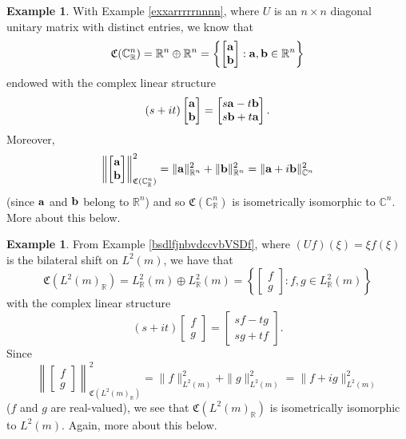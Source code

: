 \documentclass{dis}
\theoremstyle{plain}
\theoremstyle{definition}
\newtheorem{Example}[equation]{Example}
\def\C{\mathbb{C}}
\def\R{\mathbb{R}}
\renewcommand{\vec}[1]{{\bf #1}}
\newcommand{\0}{{\color{lightgray}0}}
\begin{document}
\begin{Example}\label{diagonallslslslsls}
With Example \ref{exxarrrrrnnnn}, where $U$ is an $n \times n$ diagonal unitary matrix with distinct entries, we know that 
$$\mathfrak{C}(\C^n_{\R}) = \R^n \oplus \R^n  = \left\{\begin{bmatrix} \vec{a} \\ \vec{b} \end{bmatrix}: \vec{a}, \vec{b} \in \R^n\right\}$$
endowed with the complex linear structure
$$(s + i t) \begin{bmatrix} \vec{a}\\ \vec{b}\end{bmatrix} = \begin{bmatrix} s \vec{a} - t \vec{b}\\ s \vec{b} + t \vec{a}\end{bmatrix}.$$
Moreover, 
$$\left\| \begin{bmatrix} \vec{a}\\ \vec{b}\end{bmatrix}\right\|^{2}_{\mathfrak{C}(\C^{n}_{\R})} = \|\vec{a}\|_{\R^n}^{2} + \|\vec{b}\|_{\R^n}^{2} = \|\vec{a} + i \vec{b} \|^{2}_{\C^n}$$ (since $\vec{a}$ and  $\vec{b}$ belong to $\R^n$) and so $\mathfrak{C}(\C^{n}_{\R})$ is isometrically isomorphic to $\C^n$.  More about this below.
\end{Example}


\begin{Example}\label{bilallateralll}
From Example \ref{bsdlfjnbvdccvbVSDf}, where $(U f)(\xi) = \xi f(\xi)$ is the bilateral shift on $L^2(m)$,  we have that
$$\mathfrak{C}(L^2(m)_{\R}) =  L^{2}_{\R}(m) \oplus L^{2}_{\R}(m) =  \left\{\begin{bmatrix} f\\g\end{bmatrix}: f, g \in L^{2}_{\R}(m)\right\}$$
with the complex linear structure 
$$(s + i t) \begin{bmatrix} f\\ g\end{bmatrix} = \begin{bmatrix} s f - t g\\ s g + t f\end{bmatrix}.$$
Since 
$$\left\| \begin{bmatrix} f\\ g\end{bmatrix}\right\|^{2}_{\mathfrak{C}(L^2(m)_{\R}) } = \|f\|_{L^{2}(m)}^{2} + \|g\|_{L^{2}(m)}^{2} = \|f + i g\|^{2}_{L^2(m)}$$ ($f$ and $g$ are real-valued), we see that $\mathfrak{C}(L^2(m)_{\R})$ is isometrically isomorphic to $L^2(m)$. Again, more about this below.
\end{Example}
\end{document}
